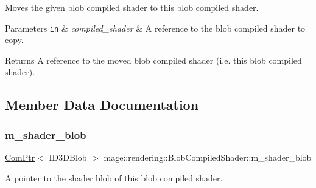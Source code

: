 Moves the given blob compiled shader to this blob compiled shader.


\begin{DoxyParams}[1]{Parameters}
\mbox{\tt in}  & {\em compiled\+\_\+shader} & A reference to the blob compiled shader to copy. \\
\hline
\end{DoxyParams}
\begin{DoxyReturn}{Returns}
A reference to the moved blob compiled shader (i.\+e. this blob compiled shader). 
\end{DoxyReturn}


\subsection{Member Data Documentation}
\mbox{\label{classmage_1_1rendering_1_1_blob_compiled_shader_ad28d77dc5fd97d127c2e2dc875384449}} 
\subsubsection{\texorpdfstring{m\+\_\+shader\+\_\+blob}{m\_shader\_blob}}
{\footnotesize\ttfamily \mbox{\hyperlink{namespacemage_ae74f374780900893caa5555d1031fd79}{Com\+Ptr}}$<$ I\+D3\+D\+Blob $>$ mage\+::rendering\+::\+Blob\+Compiled\+Shader\+::m\+\_\+shader\+\_\+blob\hspace{0.3cm}{\ttfamily [private]}}

A pointer to the shader blob of this blob compiled shader. 